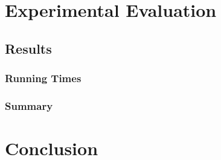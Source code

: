 \documentclass[11pt]{article}
\begin{document}
    \section{Experimental Evaluation}
    \label{sec:expe}

    \subsection{Results}
    \label{sec:results}

    \subsubsection{Running Times}

    \subsubsection{Summary}


    \section{Conclusion}
    \label{sec:conc}



    
    
\end{document}
